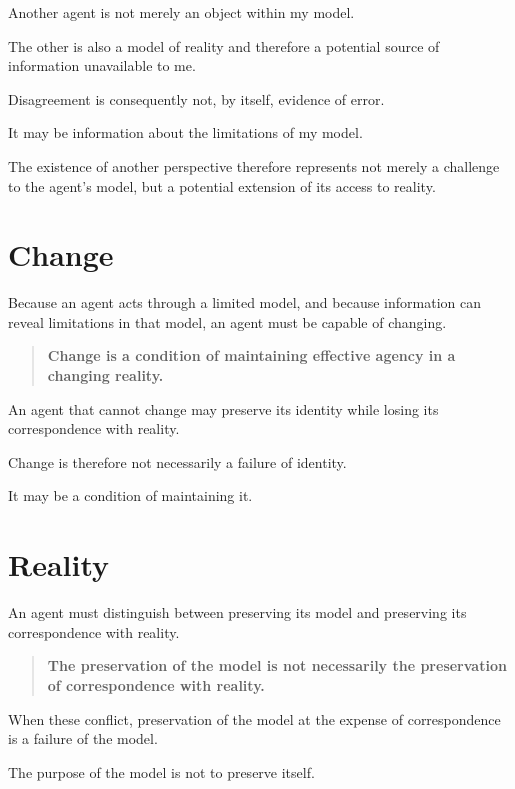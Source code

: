 \documentclass[11pt,a4paper]{article}
\begin{document}
Another agent is not merely an object within my model.

The other is also a model of reality and therefore a potential source of
information unavailable to me.

Disagreement is consequently not, by itself, evidence of error.

It may be information about the limitations of my model.

The existence of another perspective therefore represents not merely a
challenge to the agent's model, but a potential extension of its access to
reality.


\section{Change}

Because an agent acts through a limited model, and because information can
reveal limitations in that model, an agent must be capable of changing.

\begin{quote}
\textbf{Change is a condition of maintaining effective agency in a changing
reality.}
\end{quote}

An agent that cannot change may preserve its identity while losing its
correspondence with reality.

Change is therefore not necessarily a failure of identity.

It may be a condition of maintaining it.


\section{Reality}

An agent must distinguish between preserving its model and preserving its
correspondence with reality.

\begin{quote}
\textbf{The preservation of the model is not necessarily the preservation
of correspondence with reality.}
\end{quote}

When these conflict, preservation of the model at the expense of
correspondence is a failure of the model.

The purpose of the model is not to preserve itself.
\end{document}
